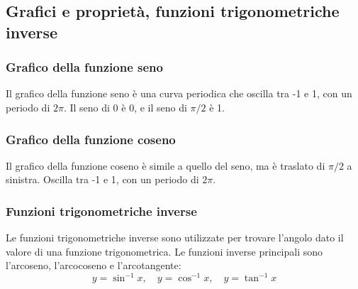 \documentclass{article}
\begin{document}
\newpage
\subsection{Grafici e proprietà, funzioni trigonometriche inverse}

\subsubsection{Grafico della funzione seno}
Il grafico della funzione seno è una curva periodica che oscilla tra -1 e 1, con un periodo
di \(2\pi\). Il seno di 0 è 0, e il seno di \(\pi/2\) è 1.


\subsubsection{Grafico della funzione coseno}
Il grafico della funzione coseno è simile a quello del seno, ma è traslato di \(\pi/2\) a
sinistra. Oscilla tra -1 e 1, con un periodo di \(2\pi\).


\subsubsection{Funzioni trigonometriche inverse}
Le funzioni trigonometriche inverse sono utilizzate per trovare l'angolo dato il valore di
una funzione trigonometrica. Le funzioni inverse principali sono l'arcoseno, l'arcocoseno e
l'arcotangente:
\[
    y = \sin^{-1} x, \quad y = \cos^{-1} x, \quad y = \tan^{-1} x
\]
\end{document}
